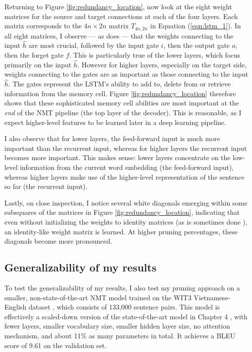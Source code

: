 Returning to Figure \ref{fig:redundancy_location}, now look at the eight weight matrices for the source and target connections at each of the four layers.
Each matrix corresponds to the $4n \times 2n$ matrix $T_{4n,2n}$ in Equation (\ref{eqn:lstm_1}).
In all eight matrices, I observe --- as does \cite{lu2016learning} --- that the weights connecting to the input $\hat{h}$ are most crucial, followed by the input gate $i$, then the output gate $o$, then the forget gate $f$. 
This is particularly true of the lower layers, which focus primarily on the input $\hat{h}$. 
However for higher layers, especially on the target side, weights connecting to the gates are as important as those connecting to the input $\hat{h}$.
The gates represent the LSTM's ability to add to, delete from or retrieve information from the memory cell.
Figure \ref{fig:redundancy_location} therefore shows that these sophisticated memory cell abilities are most important at the \emph{end} of the NMT pipeline (the top layer of the decoder).
This is reasonable, as I expect higher-level features to be learned later in a deep learning pipeline.

I also observe that for lower layers, the feed-forward input is much more important than the recurrent input, whereas for higher layers the recurrent input becomes more important.
This makes sense: lower layers concentrate on the low-level information from the current word embedding (the feed-forward input), whereas higher layers make use of the higher-level representation of the sentence so far (the recurrent input).

Lastly, on close inspection, I notice several white diagonals emerging within
some subsquares of the matrices in Figure \ref{fig:redundancy_location},
indicating that even without initializing the weights to identity matrices
(as is sometimes done \cite{le2015simple}),
an identity-like weight matrix is learned. At higher pruning percentages, these diagonals become more pronounced.

\subsection{Generalizability of my results}
To test the generalizability of my results, I also test my pruning approach
on a smaller, non-state-of-the-art NMT model trained on the WIT3 Vietnamese-English 
dataset \cite{iwslt15}, which consists of 133,000 sentence pairs.
This model is effectively a scaled-down version of the state-of-the-art model in Chapter 4 \cite{luong15attn},
with fewer layers, smaller vocabulary size, smaller hidden layer size, no attention mechanism,
and about 11\% as many parameters in total.
It achieves a BLEU score of 9.61 on the validation set.

